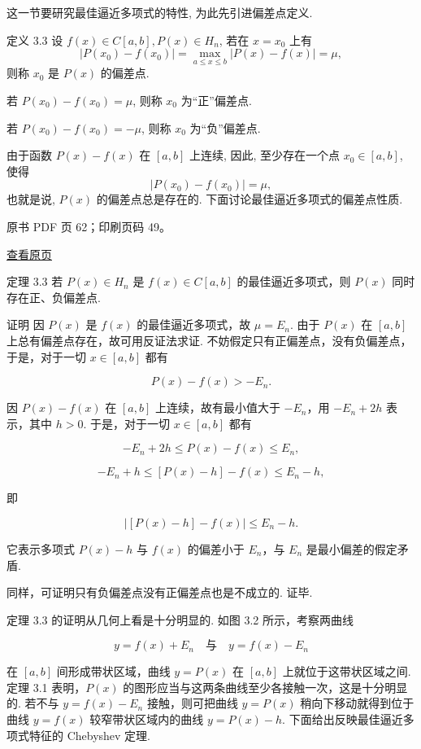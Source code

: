 这一节要研究最佳逼近多项式的特性, 为此先引进偏差点定义.

定义 3.3 设 \(f(x) \in C[a,b], P(x) \in H_n\), 若在 \(x = x_0\) 上有 \[
|P(x_0) - f(x_0)| = \max_{a \leqslant x \leqslant b}|P(x) - f(x)| = \mu,
\] 则称 \(x_0\) 是 \(P(x)\) 的偏差点.

若 \(P(x_0) - f(x_0) = \mu\), 则称 \(x_0\) 为``正''偏差点.

若 \(P(x_0) - f(x_0) = -\mu\), 则称 \(x_0\) 为``负''偏差点.

由于函数 \(P(x) - f(x)\) 在 \([a,b]\) 上连续, 因此, 至少存在一个点 \(x_0 \in [a,b]\), 使得 \[
|P(x_0) - f(x_0)| = \mu,
\] 也就是说, \(P(x)\) 的偏差点总是存在的. 下面讨论最佳逼近多项式的偏差点性质.

\clearpage

原书 PDF 页 62；印刷页码 49。

\href{source-images/pdf-062.jpeg}{查看原页}

定理 3.3 若 \(P(x) \in H_n\) 是 \(f(x) \in C[a,b]\) 的最佳逼近多项式，则 \(P(x)\) 同时存在正、负偏差点.

证明 因 \(P(x)\) 是 \(f(x)\) 的最佳逼近多项式，故 \(\mu = E_n\). 由于 \(P(x)\) 在 \([a,b]\) 上总有偏差点存在，故可用反证法求证. 不妨假定只有正偏差点，没有负偏差点，于是，对于一切 \(x \in [a,b]\) 都有

\[
P(x) - f(x) > -E_n.
\]

因 \(P(x) - f(x)\) 在 \([a,b]\) 上连续，故有最小值大于 \(-E_n\)，用 \(-E_n + 2h\) 表示，其中 \(h > 0\). 于是，对于一切 \(x \in [a,b]\) 都有

\[
-E_n + 2h \leqslant P(x) - f(x) \leqslant E_n,
\]

\[
-E_n + h \leqslant [P(x) - h] - f(x) \leqslant E_n - h,
\]

即

\[
|[P(x) - h] - f(x)| \leqslant E_n - h.
\]

它表示多项式 \(P(x) - h\) 与 \(f(x)\) 的偏差小于 \(E_n\)，与 \(E_n\) 是最小偏差的假定矛盾.

同样，可证明只有负偏差点没有正偏差点也是不成立的. 证毕.

定理 3.3 的证明从几何上看是十分明显的. 如图 3.2 所示，考察两曲线

\[
y = f(x) + E_n \quad \text{与} \quad y = f(x) - E_n
\]

在 \([a,b]\) 间形成带状区域，曲线 \(y = P(x)\) 在 \([a,b]\) 上就位于这带状区域之间. 定理 3.1 表明，\(P(x)\) 的图形应当与这两条曲线至少各接触一次，这是十分明显的. 若不与 \(y = f(x) - E_n\) 接触，则可把曲线 \(y = P(x)\) 稍向下移动就得到位于曲线 \(y = f(x)\) 较窄带状区域内的曲线 \(y = P(x) - h\). 下面给出反映最佳逼近多项式特征的 Chebyshev 定理.

